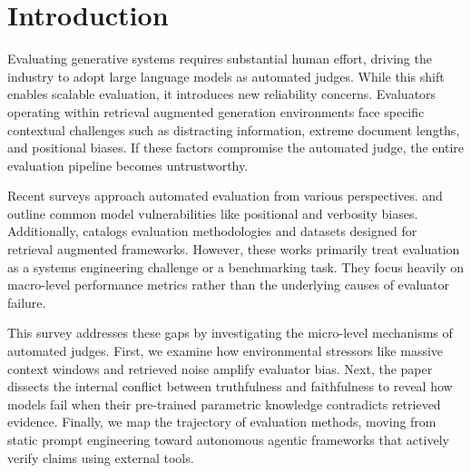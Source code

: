 \section{Introduction}

Evaluating generative systems requires substantial human effort, driving the industry to adopt large language models as automated judges. While this shift enables scalable evaluation, it introduces new reliability concerns. Evaluators operating within retrieval augmented generation environments face specific contextual challenges such as distracting information, extreme document lengths, and positional biases. If these factors compromise the automated judge, the entire evaluation pipeline becomes untrustworthy.

Recent surveys approach automated evaluation from various perspectives. \citet{gu2025surveyllmasajudge} and \citet{li2025generationjudgmentopportunitieschallenges} outline common model vulnerabilities like positional and verbosity biases. Additionally, \citet{Brehme_2025} catalogs evaluation methodologies and datasets designed for retrieval augmented frameworks. However, these works primarily treat evaluation as a systems engineering challenge or a benchmarking task. They focus heavily on macro-level performance metrics rather than the underlying causes of evaluator failure.

This survey addresses these gaps by investigating the micro-level mechanisms of automated judges. First, we examine how environmental stressors like massive context windows and retrieved noise amplify evaluator bias. Next, the paper dissects the internal conflict between truthfulness and faithfulness to reveal how models fail when their pre-trained parametric knowledge contradicts retrieved evidence. Finally, we map the trajectory of evaluation methods, moving from static prompt engineering toward autonomous agentic frameworks that actively verify claims using external tools.